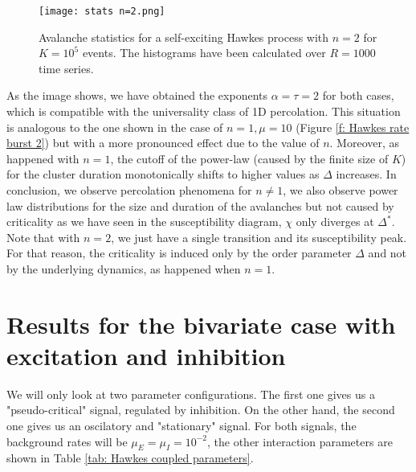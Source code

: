 \begin{figure}[H]
    \centering
    \texttt{[image: stats n=2.png]}
    \caption{Avalanche statistics for a self-exciting Hawkes process with $n=2$ for $K=10^5$ events. The histograms have been calculated over $R=1000$ time series.}
    \label{f:avalanches_n=2} 
\end{figure}
    


As the image shows, we have obtained the exponents $\alpha=\tau=2$ for both cases, which is compatible with the universality class of 1D percolation. This situation is analogous to the 
one shown in the case of $n=1, \mu=10$ (Figure \ref{f: Hawkes rate burst 2}) but with a more pronounced effect due to the value of $n$. Moreover, as happened with $n=1$, the cutoff 
of the power-law (caused by the finite size of $K$) for the cluster duration monotonically shifts to higher values as $\Delta$ increases.
In conclusion, we observe percolation phenomena for 
$n\neq 1$, we also observe power law distributions for the size and duration of the avalanches but not caused by criticality as we have seen in the susceptibility diagram, $\chi$ only diverges
at $\Delta^*$. 
Note that with $n=2$, we just have a single transition and its susceptibility peak. For that reason, the criticality is induced only by the order parameter $\Delta$ and not by the 
underlying dynamics, as happened when $n=1$.


\section{Results for the bivariate case with excitation and inhibition}

We will only look at two parameter 
configurations. The first one gives us a "pseudo-critical" signal, regulated by inhibition. On the other hand, the second one gives us an oscilatory and "stationary" signal. For both signals, 
the background rates will be $\mu_E=\mu_I=10^{-2}$, the other interaction parameters are shown in Table \ref{tab: Hawkes coupled parameters}.


